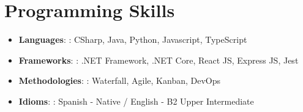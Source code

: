 \documentclass[letterpaper,11pt]{article}
\newcommand{\resumeItem}[2]{
  \item\small{
    \textbf{#1}{: #2 \vspace{-2pt}}
  }
}
\newcommand{\resumeSubItem}[2]{\resumeItem{#1}{#2}\vspace{-4pt}}
\newcommand{\resumeSubHeadingListStart}{\begin{itemize}[leftmargin=*]}
\newcommand{\resumeSubHeadingListEnd}{\end{itemize}}
\begin{document}
%
\section{Programming Skills}
  \resumeSubHeadingListStart
    
      \resumeSubItem{Languages}{: CSharp, Java, Python, Javascript, TypeScript}          
      \resumeSubItem{Frameworks}{: .NET Framework, .NET Core, React JS, Express JS, Jest}      
      \resumeSubItem{Methodologies}{: Waterfall, Agile, Kanban, DevOps}      
      \resumeSubItem{Idioms}{: Spanish - Native / English - B2 Upper Intermediate}
    
  \resumeSubHeadingListEnd


\end{document}
